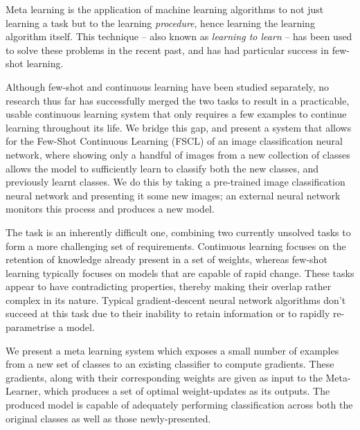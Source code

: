 \documentclass{report}
\begin{document}
Meta learning is the application of machine learning algorithms to not just learning a task but to the learning \emph{procedure}, hence learning the learning algorithm itself. This technique -- also known as \emph{learning to learn} -- has been used to solve these problems in the recent past\parencite{lotsag}\parencite{maml}\parencite{reptile}\parencite{mlwtc}, and has had particular success in few-shot learning\parencite{maml}\parencite{matching}\parencite{mlwtc}. \par

Although few-shot and continuous learning have been studied separately, no research thus far has successfully merged the two tasks to result in a practicable, usable continuous learning system that only requires a few examples to continue learning throughout its life. We bridge this gap, and present a system that allows for the Few-Shot Continuous Learning (FSCL) of an image classification neural network, where showing only a handful of images from a new collection of classes allows the model to sufficiently learn to classify both the new classes, and previously learnt classes. We do this by taking a pre-trained image classification neural network and presenting it some new images; an external neural network monitors this process and produces a new model. \par

The task is an inherently difficult one, combining two currently unsolved tasks to form a more challenging set of requirements. Continuous learning focuses on the retention of knowledge already present in a set of weights, whereas few-shot learning typically focuses on models that are capable of rapid change. These tasks appear to have contradicting properties, thereby making their overlap rather complex in its nature. Typical gradient-descent neural network algorithms don't succeed at this task due to their inability to retain information or to rapidly re-parametrise a model. \par

We present a meta learning system which exposes a small number of examples from a new set of classes to an existing classifier to compute gradients. These gradients, along with their corresponding weights are given as input to the Meta-Learner, which produces a set of optimal weight-updates as its outputs. The produced model is capable of adequately performing classification across both the original classes as well as those newly-presented. \par
\end{document}
